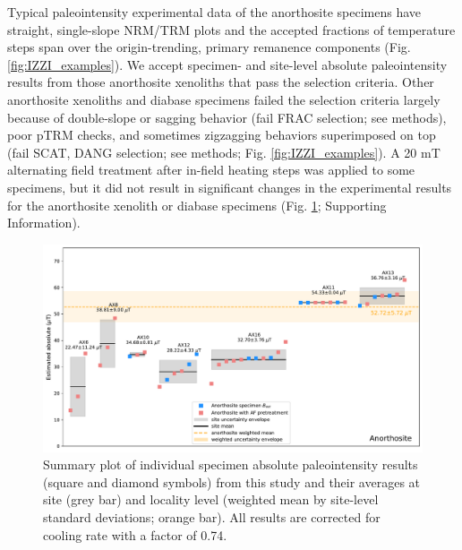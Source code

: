 \documentclass[9pt,twocolumn,twoside,lineno]{pnas-new}
\begin{document}
Typical paleointensity experimental data of the anorthosite specimens have straight, single-slope NRM/TRM plots and the accepted fractions of temperature steps span over the origin-trending, primary remanence components (Fig. \ref{fig:IZZI_examples}). We accept specimen- and site-level absolute paleointensity results from those anorthosite xenoliths that pass the selection criteria. Other anorthosite xenoliths and diabase specimens failed the selection criteria largely because of double-slope or sagging behavior (fail FRAC selection; see methods), poor pTRM checks, and sometimes zigzagging behaviors superimposed on top (fail SCAT, DANG selection; see methods; Fig. \ref{fig:IZZI_examples}). A 20 mT alternating field treatment after in-field heating steps was applied to some specimens, but it did not result in significant changes in the experimental results for the anorthosite xenolith or diabase specimens (Fig. \ref{fig:PINT_cooling_corrected}; Supporting Information). 

\begin{figure}[h!]
\noindent\includegraphics[width=17.8 cm]{Paleointensity_plot_cooling_corrected.pdf}
\centering
\caption{\small{Summary plot of individual specimen absolute paleointensity results (square and diamond symbols) from this study and their averages at site (grey bar) and locality level (weighted mean by site-level standard deviations; orange bar). All results are corrected for cooling rate with a factor of 0.74. }}
\label{fig:PINT_cooling_corrected}
\end{figure}
\end{document}
